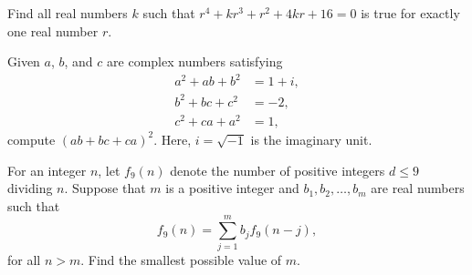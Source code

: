 %	




\begin{question}[name={2014 HMMT, Algebra, \href{https://artofproblemsolving.com/community/c129h596747p3541017}{Problem 8}}]
	Find all real numbers $k$ such that $r^4+kr^3+r^2+4kr+16=0$ is true for exactly one real number $r$.	
\end{question}




%	









\begin{question}[name={2014 HMMT, Algebra, \href{}{Problem }}]
	Given $a$, $b$, and $c$ are complex numbers satisfying
	\begin{align*}
		a^2+ab+b^2 &= 1+i,\\
		b^2+bc+c^2 &= -2,\\
		c^2+ca+a^2 &= 1,
	\end{align*}
	compute $(ab+bc+ca)^2$. Here, $i=\sqrt{-1}$ is the imaginary unit.
\end{question}




%	







\begin{question}[name={2014 HMMT, Algebra, \href{https://artofproblemsolving.com/community/c129h596748p3541020}{Problem 10}}]
	For an integer $n$, let $f_9(n)$ denote the number of positive integers $d\leq 9$ dividing $n$. Suppose that $m$ is a positive integer and $b_1,b_2,\ldots,b_m$ are real numbers such that $$f_9(n)=\textstyle\sum_{j=1}^mb_jf_9(n-j),$$ for all $n>m$. Find the smallest possible value of $m$.
\end{question}




